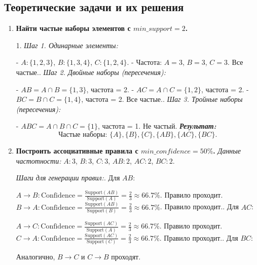 \subsection{Теоретические задачи и их решения}
\bigskip
\begin{enumerate}
    \item {\textbf{Найти частые наборы элементов с \(min\_support = 2\).}\newline

          1. \textit{Шаг 1. Одинарные элементы:}\par
          - \(A: \{1, 2, 3\}\), \(B: \{1, 3, 4\}\), \(C: \{1, 2, 4\}\).\newline
          - Частота: \(A = 3\), \(B = 3\), \(C = 3\). Все частые.. \textit{Шаг 2. Двойные наборы (пересечения):}\par
          - \(AB = A \cap B = \{1, 3\}\), частота = 2.\newline
          - \(AC = A \cap C = \{1, 2\}\), частота = 2.\newline
          - \(BC = B \cap C = \{1, 4\}\), частота = 2.\newline
          Все частые.. \textit{Шаг 3. Тройные наборы (пересечения):}\par
          - \(ABC = A \cap B \cap C = \{1\}\), частота = 1. Не частый.\newline
          \textbf{\textit{Результат:}}
          \[
              \text{Частые наборы: } \{A\}, \{B\}, \{C\}, \{AB\}, \{AC\}, \{BC\}.
          \]}
    \item {\textbf{Построить ассоциативные правила с \(min\_confidence = 50\%\).}\newline
          \textit{Данные частотности:}\newline
          \(A: 3\), \(B: 3\), \(C: 3\), \(AB: 2\), \(AC: 2\), \(BC: 2\).

          \textit{Шаги для генерации правил:}. Для \(AB\):\par
          \(A \rightarrow B: \text{Confidence} = \frac{\text{Support}(AB)}{\text{Support}(A)} = \frac{2}{3} \approx 66.7\%\).
          Правило проходит.\newline
          \(B \rightarrow A: \text{Confidence} = \frac{\text{Support}(AB)}{\text{Support}(B)} = \frac{2}{3} \approx 66.7\%\).
          Правило проходит.. Для \(AC\):\par
          \(A \rightarrow C: \text{Confidence} = \frac{\text{Support}(AC)}{\text{Support}(A)} = \frac{2}{3} \approx 66.7\%\).
          Правило проходит. \newline
          \(C \rightarrow A: \text{Confidence} = \frac{\text{Support}(AC)}{\text{Support}(C)} = \frac{2}{3} \approx 66.7\%\).
          Правило проходит.. Для \(BC\):\par
          Аналогично, \(B \rightarrow C\) и \(C \rightarrow B\) проходят.\newline

}
\end{enumerate}
